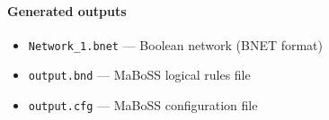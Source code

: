 \endgroup

\paragraph{Generated outputs}
\begin{itemize}
\item \texttt{Network\_\allowbreak{}1.\allowbreak{}bnet} — Boolean network (BNET format)
\item \texttt{output.\allowbreak{}bnd} — MaBoSS logical rules file
\item \texttt{output.\allowbreak{}cfg} — MaBoSS configuration file
\end{itemize}
